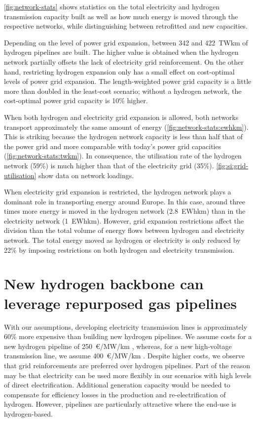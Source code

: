 \cref{fig:network-stats} shows statistics on the total electricity and hydrogen
transmission capacity built as well as how much energy is moved through the
respective networks, while distinguishing between retrofitted and new
capacities.


Depending on the level of power grid expansion, between 342 and 422~TWkm of
hydrogen pipelines are built. The higher value is obtained when the hydrogen
network partially offsets the lack of electricity grid reinforcement. On the
other hand, restricting hydrogen expansion only has a small effect on
cost-optimal levels of power grid expansion. The length-weighted power grid
capacity is a little more than doubled in the least-cost scenario; without a
hydrogen network, the cost-optimal power grid capacity is 10\%
higher.


When both hydrogen and electricity grid expansion is allowed, both networks
transport approximately the same amount of energy
(\cref{fig:network-stats:ewhkm}). This is striking because the hydrogen network
capacity is less than half that of the power grid and more comparable with
today's power grid capacities (\cref{fig:network-stats:twkm}). In consequence,
the utilisation rate of the hydrogen network (59\%) is much higher than that of
the electricity grid (35\%). \cref{fig:si:grid-utilisation} show data on network
loadings.

When electricity grid expansion is restricted, the hydrogen network plays a
dominant role in transporting energy around Europe. In this case, around three
times more energy is moved in the hydrogen network (2.8~EWhkm) than in the
electricity network (1~EWhkm). However, grid expansion restrictions affect the
division than the total volume of energy flows between hydrogen and electricity
network. The total energy moved as hydrogen or electricity is only reduced by
22\% by imposing restrictions on both hydrogen and electricity transmission.

\section*{New hydrogen backbone can leverage repurposed gas pipelines}
\label{sec:repurposed}


With our assumptions, developing electricity transmission lines is approximately
60\% more expensive than building new hydrogen pipelines. We assume costs for a
new hydrogen pipeline of 250~\euro/MW/km \cite{}, whereas, for a new
high-voltage transmission line, we assume 400~\euro/MW/km \cite{}. Despite
higher costs, we observe that grid reinforcements are preferred over hydrogen
pipelines. Part of the reason may be that electricity can be used more flexibly
in our scenarios with high levels of direct electrification. Additional
generation capacity would be needed to compensate for efficiency losses in the
production and re-electrification of hydrogen. However, pipelines are
particularly attractive where the end-use is hydrogen-based.

